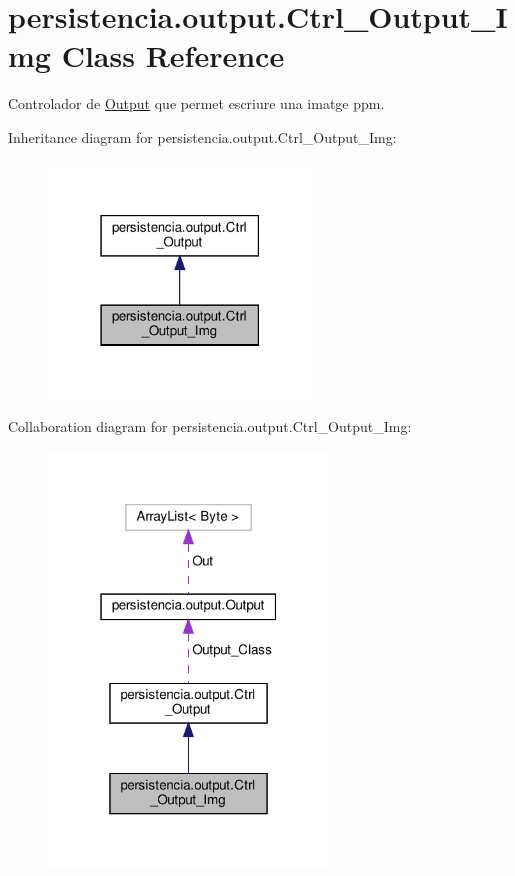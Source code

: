 \hypertarget{classpersistencia_1_1output_1_1Ctrl__Output__Img}{}\section{persistencia.\+output.\+Ctrl\+\_\+\+Output\+\_\+\+Img Class Reference}
\label{classpersistencia_1_1output_1_1Ctrl__Output__Img}


Controlador de \hyperlink{classpersistencia_1_1output_1_1Output}{Output} que permet escriure una imatge ppm.  




Inheritance diagram for persistencia.\+output.\+Ctrl\+\_\+\+Output\+\_\+\+Img\+:\nopagebreak
\begin{figure}[H]
\begin{center}
\leavevmode
\includegraphics[width=198pt]{classpersistencia_1_1output_1_1Ctrl__Output__Img__inherit__graph}
\end{center}
\end{figure}


Collaboration diagram for persistencia.\+output.\+Ctrl\+\_\+\+Output\+\_\+\+Img\+:\nopagebreak
\begin{figure}[H]
\begin{center}
\leavevmode
\includegraphics[width=211pt]{classpersistencia_1_1output_1_1Ctrl__Output__Img__coll__graph}
\end{center}
\end{figure}
